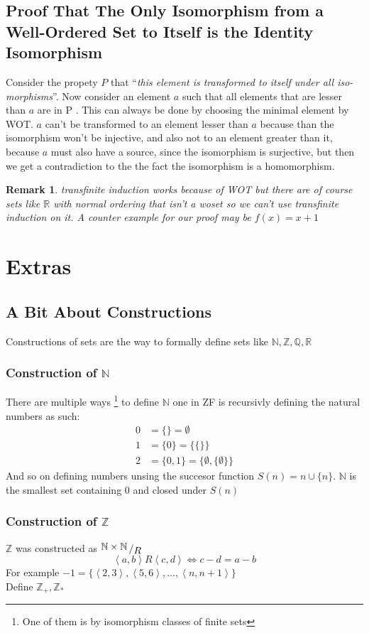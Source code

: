 \documentclass{article}
\newcommand{\N}{\mathbb{N}}
\newcommand{\Z}{\mathbb{Z}}
\newcommand{\Q}{\mathbb{Q}}
\newcommand{\R}{\mathbb{R}}
\theoremstyle{plain}
\newtheorem{remark}{Remark}[section]
\newcommand{\bigslant}[2]
{{\raisebox{.2em}{$#1$}\left/\raisebox{-.2em}{$#2$}\right.}}
\begin{document}
\subsection{Proof That The Only Isomorphism from a Well-Ordered Set to Itself 
is the Identity Isomorphism}
Consider the propety $P$ that 
``\emph{this element is transformed to itself under all iso-
morphisms}''. 
Now consider an element $a$ such that all elements that are lesser
than $a$ are in P . This can always be done by choosing the minimal element
by WOT. $a$ can’t be transformed to an element lesser than $a$ because than
the isomorphism won’t be injective, and also not to an element greater than
it, because $a$ must also have a source, since the isomorphism is surjective, 
but then we get a contradiction to the the fact the isomorphism is a
homomorphism.
\begin{remark}
	transfinite induction works because of WOT but there are of course sets
	like $\R$ with normal ordering that isn’t a woset so we can’t use 
	transfinite induction on it. 
	A counter example for our proof may be $f(x) = x + 1$
\end{remark}

\newpage

\section{Extras}
\subsection{A Bit About Constructions}
Constructions of sets are the way to formally define sets like $\N,\Z,\Q,\R$
\subsubsection{Construction of $\N$}
There are multiple ways
\footnote{One of them is by isomorphism classes of finite sets} 
to define $\N$ one in ZF is recursivly defining the natural
numbers as such:
\begin{align*}
	0 &= \{\} = \emptyset \\
	1 &= \{0\} = \{\{\}\} \\
	2 &= \{0,1\} = \{\emptyset,\{\emptyset\}\}
\end{align*}
And so on defining numbers unsing the succesor function $S(n)=n\cup\{n\}$.
$\N$ is the smallest set containing $0$ and closed under $S(n)$
\subsubsection{Construction of $\Z$}
$\Z$ was constructed as $\bigslant{\N\times\N}{R}$
\[
	\left<a,b\right>R\left<c,d\right> \iff c-d=a-b
\]
For example 
$-1=\{\left<2,3\right>,\left<5,6\right>,\ldots,\left<n,n+1\right>\}$\\
Define $\Z_+,\Z_*$
\end{document}

